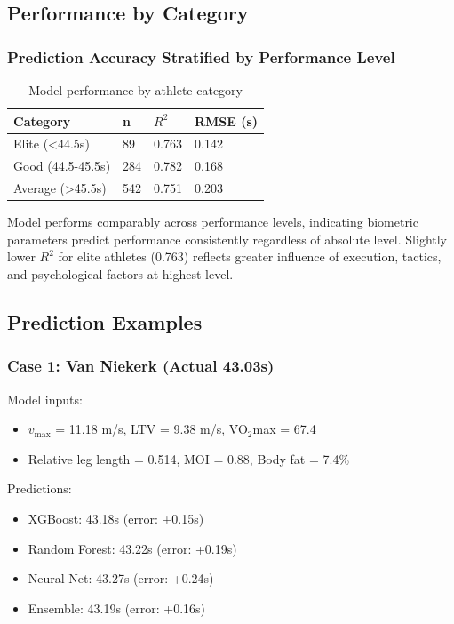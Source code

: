 \subsection{Performance by Category}

\subsubsection{Prediction Accuracy Stratified by Performance Level}

\begin{table}[H]
\centering
\caption{Model performance by athlete category}
\begin{tabular}{@{}llll@{}}
\toprule
\textbf{Category} & \textbf{n} & \textbf{$R^2$} & \textbf{RMSE (s)} \\
\midrule
Elite (<44.5s) & 89 & 0.763 & 0.142 \\
Good (44.5-45.5s) & 284 & 0.782 & 0.168 \\
Average (>45.5s) & 542 & 0.751 & 0.203 \\
\bottomrule
\end{tabular}
\end{table}

Model performs comparably across performance levels, indicating biometric parameters predict performance consistently regardless of absolute level. Slightly lower $R^2$ for elite athletes (0.763) reflects greater influence of execution, tactics, and psychological factors at highest level.

\subsection{Prediction Examples}

\subsubsection{Case 1: Van Niekerk (Actual 43.03s)}

Model inputs:
\begin{itemize}
    \item $v_{\max}$ = 11.18 m/s, LTV = 9.38 m/s, VO$_2$max = 67.4
    \item Relative leg length = 0.514, MOI = 0.88, Body fat = 7.4\%
\end{itemize}

Predictions:
\begin{itemize}
    \item XGBoost: 43.18s (error: +0.15s)
    \item Random Forest: 43.22s (error: +0.19s)
    \item Neural Net: 43.27s (error: +0.24s)
    \item Ensemble: 43.19s (error: +0.16s)
\end{itemize}

